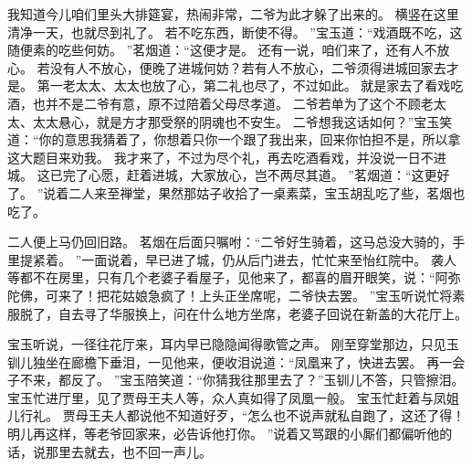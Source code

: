 我知道今儿咱们里头大排筵宴，热闹非常，二爷为此才躲了出来的。
横竖在这里清净一天，也就尽到礼了。
若不吃东西，断使不得。
”宝玉道：“戏酒既不吃，这随便素的吃些何妨。
”茗烟道：“这便才是。
还有一说，咱们来了，还有人不放心。
若没有人不放心，便晚了进城何妨？若有人不放心，二爷须得进城回家去才是。
第一老太太、太太也放了心，第二礼也尽了，不过如此。
就是家去了看戏吃酒，也并不是二爷有意，原不过陪着父母尽孝道。
二爷若单为了这个不顾老太太、太太悬心，就是方才那受祭的阴魂也不安生。
二爷想我这话如何？”宝玉笑道：“你的意思我猜着了，你想着只你一个跟了我出来，回来你怕担不是，所以拿这大题目来劝我。
我才来了，不过为尽个礼，再去吃酒看戏，并没说一日不进城。
这已完了心愿，赶着进城，大家放心，岂不两尽其道。
”茗烟道：“这更好了。
”说着二人来至禅堂，果然那姑子收拾了一桌素菜，宝玉胡乱吃了些，茗烟也吃了。
\par
二人便上马仍回旧路。
茗烟在后面只嘱咐：“二爷好生骑着，这马总没大骑的，手里提紧着。
”一面说着，早已进了城，仍从后门进去，忙忙来至怡红院中。
袭人等都不在房里，只有几个老婆子看屋子，见他来了，都喜的眉开眼笑，说：“阿弥陀佛，可来了！把花姑娘急疯了！上头正坐席呢，二爷快去罢。
”宝玉听说忙将素服脱了，自去寻了华服换上，问在什么地方坐席，老婆子回说在新盖的大花厅上。
\par
宝玉听说，一径往花厅来，耳内早已隐隐闻得歌管之声。
刚至穿堂那边，只见玉钏儿独坐在廊檐下垂泪，一见他来，便收泪说道：“凤凰来了，快进去罢。
再一会子不来，都反了。
”宝玉陪笑道：“你猜我往那里去了？”玉钏儿不答，只管擦泪。
宝玉忙进厅里，见了贾母王夫人等，众人真如得了凤凰一般。
宝玉忙赶着与凤姐儿行礼。
贾母王夫人都说他不知道好歹，“怎么也不说声就私自跑了，这还了得！明儿再这样，等老爷回家来，必告诉他打你。
”说着又骂跟的小厮们都偏听他的话，说那里去就去，也不回一声儿。
